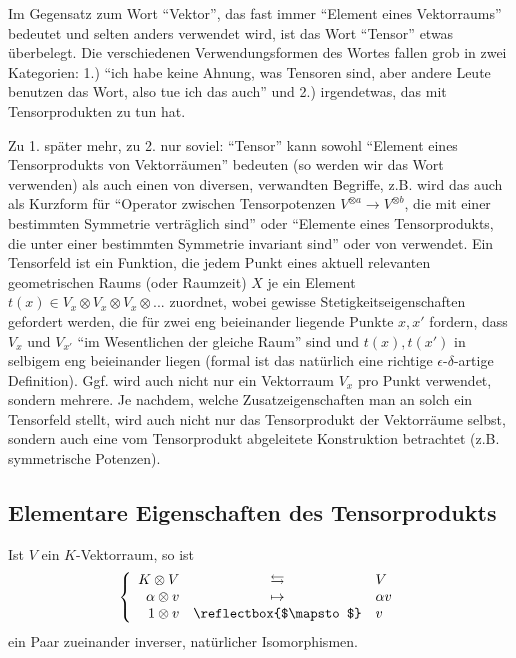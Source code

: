 \begin{remark}
Im Gegensatz zum Wort \enquote{Vektor}, das fast immer \enquote{Element eines Vektorraums} bedeutet und selten anders verwendet wird, ist das Wort \enquote{Tensor} etwas überbelegt. Die verschiedenen Verwendungsformen des Wortes fallen grob in zwei Kategorien: 1.) \enquote{ich habe keine Ahnung, was Tensoren sind, aber andere Leute benutzen das Wort, also tue ich das auch} und 2.) irgendetwas, das mit Tensorprodukten zu tun hat.

\smallbreak
Zu 1. später mehr, zu 2. nur soviel: \enquote{Tensor} kann sowohl \enquote{Element eines Tensorprodukts von Vektorräumen} bedeuten (so werden wir das Wort verwenden) als auch einen von diversen, verwandten Begriffe, z.B. wird das auch als Kurzform für \enquote{Operator zwischen Tensorpotenzen $V^{\otimes a}\to V^{\otimes b}$, die mit einer bestimmten Symmetrie verträglich sind} oder \enquote{Elemente eines Tensorprodukts, die unter einer bestimmten Symmetrie invariant sind} oder von  verwendet. Ein Tensorfeld ist ein Funktion, die jedem Punkt eines aktuell relevanten geometrischen Raums (oder Raumzeit) $X$ je ein Element $t(x)\in V_x\otimes V_x \otimes V_x \otimes ... $ zuordnet, wobei gewisse Stetigkeitseigenschaften gefordert werden, die für zwei eng beieinander liegende Punkte $x,x'$ fordern, dass $V_x$ und $V_{x'}$ \enquote{im Wesentlichen der gleiche Raum} sind und $t(x),t(x')$ in selbigem eng beieinander liegen (formal ist das natürlich eine richtige $\epsilon$-$\delta$-artige Definition). Ggf. wird auch nicht nur ein Vektorraum $V_x$ pro Punkt verwendet, sondern mehrere. Je nachdem, welche Zusatzeigenschaften man an solch ein Tensorfeld stellt, wird auch nicht nur das Tensorprodukt der Vektorräume selbst, sondern auch eine vom Tensorprodukt abgeleitete Konstruktion betrachtet (z.B. symmetrische Potenzen).
\end{remark}

\subsection{Elementare Eigenschaften des Tensorprodukts}

\begin{lemma}[{$K\otimes V = V$}]
Ist $V$ ein $K$-Vektorraum, so ist
\[\left\{\begin{array}{rcl}
K\otimes V & \leftrightarrows & V \\
\alpha\otimes v & \mapsto & \alpha v \\
1\otimes v & \reflectbox{$\mapsto$} & v
\end{array}\right.\]
ein Paar zueinander inverser, natürlicher Isomorphismen.
\end{lemma}

